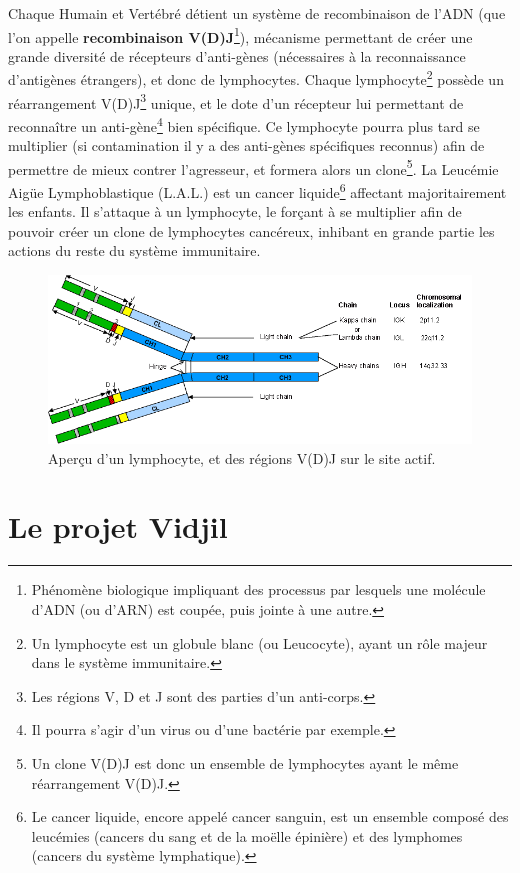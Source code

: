\documentclass[pdftex,12pt,a4paper]{report}
\begin{document}
\begin{spacing}{1.2}
Chaque Humain et Vertébré détient un système de recombinaison de l'ADN (que l'on appelle \textbf{recombinaison V(D)J}\footnote{Phénomène biologique impliquant des processus par lesquels une molécule d'ADN (ou d'ARN) est coupée, puis jointe à une autre.}), mécanisme permettant de créer une grande diversité de récepteurs d'anti-gènes (nécessaires à la reconnaissance d'antigènes étrangers), et donc de lymphocytes.
Chaque lymphocyte\footnote{Un lymphocyte est un globule blanc (ou Leucocyte), ayant un rôle majeur dans le système immunitaire.} possède un réarrangement V(D)J\footnote{Les régions V, D et J sont des parties d'un anti-corps.} unique, et le dote d'un récepteur lui permettant de reconnaître un anti-gène\footnote{Il pourra s'agir d'un virus ou d'une bactérie par exemple.} bien spécifique. Ce lymphocyte pourra plus tard se multiplier (si contamination il y a des anti-gènes spécifiques reconnus) afin de permettre de mieux contrer l'agresseur, et formera alors un clone\footnote{Un clone V(D)J est donc un ensemble de lymphocytes ayant le même réarrangement V(D)J.}.
\newline
La Leucémie Aigüe Lymphoblastique (L.A.L.) est un cancer liquide\footnote{Le cancer liquide, encore appelé cancer sanguin, est un ensemble composé des leucémies (cancers du sang et de la moëlle épinière) et des lymphomes (cancers du système lymphatique).} affectant majoritairement les enfants. Il s'attaque à un lymphocyte, le forçant à se multiplier afin de pouvoir créer un clone de lymphocytes cancéreux, inhibant en grande partie les actions du reste du système immunitaire.

\begin{figure}[h!]
\begin{center}
	\includegraphics[scale=0.35]{img/angfig1.png}
\end{center}
\caption{Aperçu d'un lymphocyte, et des régions V(D)J sur le site actif.}
\end{figure}

\section{Le projet Vidjil}


\end{spacing}
\end{document}
